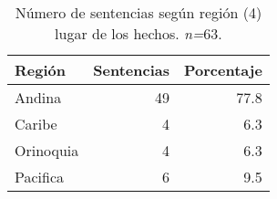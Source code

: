 \begin{table}[!htbp]
\centering
\caption{Número de sentencias según región (4) lugar de los hechos. \textit{n=}63.} 
\label{tab:reghec}
\begin{tabular}{lrr}
  \hline
Región & Sentencias & Porcentaje \\ 
  \hline
Andina & 49 & 77.8 \\ 
  Caribe &  4 & 6.3 \\ 
  Orinoquia &  4 & 6.3 \\ 
  Pacifica &  6 & 9.5 \\ 
   \hline
\end{tabular}
\end{table}
